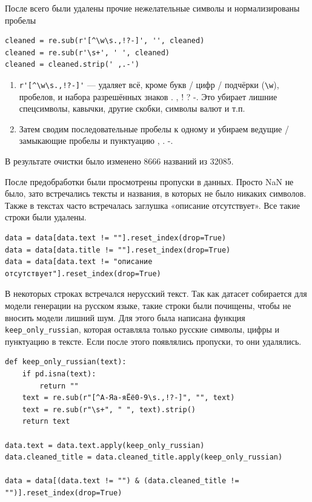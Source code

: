 \documentclass[coursework]{SCWorks}
\begin{document}
    После всего были удалены прочие нежелательные символы и нормализированы пробелы

    \begin{verbatim}
cleaned = re.sub(r'[^\w\s.,!?-]', '', cleaned)
cleaned = re.sub(r'\s+', ' ', cleaned)
cleaned = cleaned.strip(' ,.-')
    \end{verbatim}

    \begin{enumerate}
        \item \verb~r'[^\w\s.,!?-]'~ — удаляет всё, кроме букв / цифр / подчёрки (\verb~\w~), пробелов, и набора разрешённых знаков . , ! ? -.
        Это убирает лишние спецсимволы, кавычки, другие скобки, символы валют и т.п.
        \item Затем сводим последовательные пробелы к одному и убираем ведущие / замыкающие пробелы и пунктуацию , . -.
    \end{enumerate}

    В результате очистки было изменено 8666 названий из 32085.

    После предобработки были просмотрены пропуски в данных.
    Просто NaN не было, зато встречались тексты и названия, в которых не было никаких символов.
    Также в текстах часто встречалась заглушка «описание отсутствует».
    Все такие строки были удалены.

    \begin{verbatim}
data = data[data.text != ""].reset_index(drop=True)
data = data[data.title != ""].reset_index(drop=True)
data = data[data.text != "описание отсутствует"].reset_index(drop=True)
    \end{verbatim}

    В некоторых строках встречался нерусский текст.
    Так как датасет собирается для модели генерации на русском языке, такие строки были почищены, чтобы не вносить модели лишний шум.
    Для этого была написана функция \texttt{keep\_only\_russian}, которая оставляла только русские символы, цифры и пунктуацию в тексте.
    Если после этого появлялись пропуски, то они удалялись.

    \begin{verbatim}
def keep_only_russian(text):
    if pd.isna(text):
        return ""
    text = re.sub(r"[^А-Яа-яЁё0-9\s.,!?-]", "", text)
    text = re.sub(r"\s+", " ", text).strip()
    return text

data.text = data.text.apply(keep_only_russian)
data.cleaned_title = data.cleaned_title.apply(keep_only_russian)

data = data[(data.text != "") & (data.cleaned_title != "")].reset_index(drop=True)
    \end{verbatim}
\end{document}
